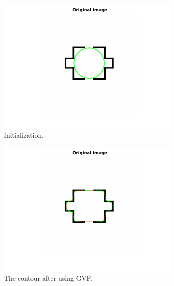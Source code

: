 \documentclass{article}
\begin{document}
\begin{figure}[H]
\centering
\begin{subfigure}{0.49\textwidth}
  \centering
  \includegraphics[width=\linewidth]{6roomInit.png}
  \caption{Initialization.}
  \label{fig10a}
\end{subfigure}
\begin{subfigure}{0.49\textwidth}
  \centering
  \includegraphics[width=\linewidth]{6roomGVF.png}
  \caption{The contour after using GVF.}
  \label{fig10b}
\end{subfigure}
\begin{subfigure}{0.49\textwidth}
  \centering

\end{subfigure}
\end{figure}
\end{document}
